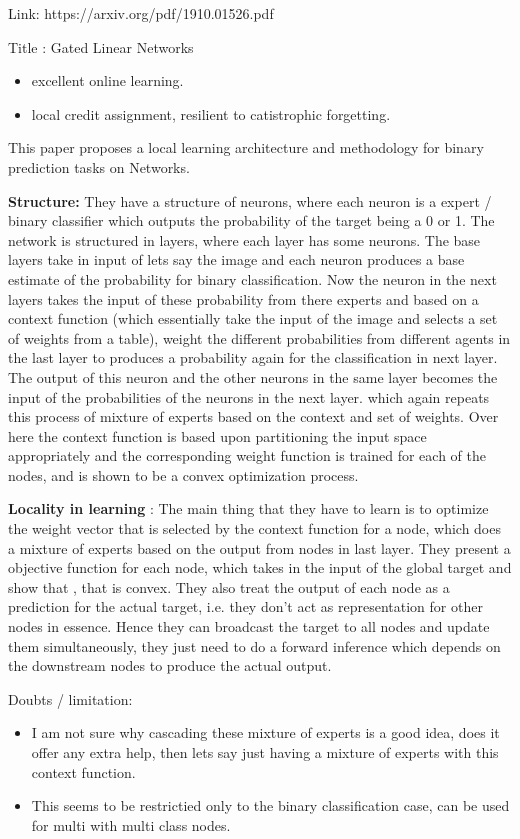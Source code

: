 \documentclass{article}
\begin{document}
Link: https://arxiv.org/pdf/1910.01526.pdf

Title : Gated Linear Networks

\begin{itemize}
\item excellent online learning.
\item local credit assignment, resilient to catistrophic forgetting. 
\end{itemize}
This paper proposes a local learning architecture and methodology for binary prediction tasks on Networks. 

\textbf{Structure: }They have a structure of neurons, where each neuron is a expert / binary classifier which outputs the probability of the target being a 0 or 1. The network is structured in layers, where each layer has some neurons. The base layers take in input of lets say the image and each neuron produces a base estimate of the probability for binary classification. Now the neuron in the next layers takes the input of these probability from there experts and based on a context function (which essentially take the input of the image and selects a set of weights from a table), weight the different probabilities from different agents in the last layer to produces a probability again for the classification in next layer. The output of this neuron and the other neurons in the same layer becomes the input of the probabilities of the neurons in the next layer. which again repeats this process of mixture of experts based on the context and set of weights. Over here the context function is based upon partitioning the input space appropriately and the corresponding weight function is trained for each of the nodes, and is shown to be a convex optimization process. 

\textbf{Locality in learning }: The main thing that they have to learn is to optimize the weight vector that is selected by the context function for a node, which does a mixture of experts based on the output from nodes in last layer. They present a objective function for each node, which takes in the input of the global target and show that , that is convex. They also treat the output of each node as a prediction for the actual target, i.e. they don't act as representation for other nodes in essence. Hence they can broadcast the target to all nodes and update them simultaneously, they just need to do a forward inference which depends on the downstream nodes to produce the actual output. 

Doubts / limitation: 
\begin{itemize}
    \item I am not sure why cascading these mixture of experts is a good idea, does it offer any extra help, then lets say just having a mixture of experts with this context function. 
    \item This seems to be restrictied only to the binary classification case, can be used for multi with multi class nodes. 
\end{itemize}
\end{document}
